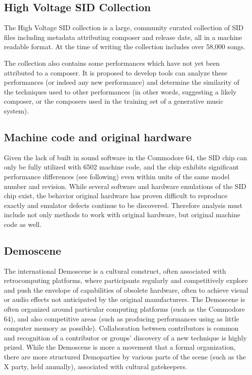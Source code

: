 \documentclass[10pt]{article}
\begin{document}
\begin{multicols*}{2}
  \subsection{High Voltage SID Collection}
  The High Voltage SID collection is a large, community curated
  collection of SID files including metadata attributing composer
  and release date, all in a machine readable format. At the time
  of writing the collection includes over 58,000 songs.

  The collection also contains some performances which have not
  yet been attributed to a composer. It is proposed to develop tools
  can analyze these performances (or indeed any new performance) and
  determine the similarity of the techniques used to other
  performances (in other words, suggesting a likely composer, or the
  composers used in the training set of a generative music system).

  \subsection{Machine code and original hardware}
  Given the lack of built in sound software in the Commodore 64, the
  SID chip can only be fully utilized with 6502 machine code, and the
  chip exhibits significant performance differences (see following)
  even within units of the same model number and revision.  While
  several software and hardware emulations of the SID chip exist, the
  behavior original hardware has proven difficult to reproduce exactly
  and emulator defects continue to be discovered.  Therefore analysis
  must include not only methods to work with original hardware, but
  original machine code as well.

  \subsection{Demoscene}
  The international Demoscene is a cultural construct, often associated
  with retrocomputing platforms, where participants regularly and
  competitively explore and push the envelope of capabilities of obsolete
  hardware, often to achieve visual or audio effects not anticipated
  by the original manufacturers. The Demoscene is often organized around
  particular computing platforms (such as the Commodore 64), and also
  competitive areas (such as producing performances using as little
  computer memory as possible). Collaboration between contributors is
  common and recognition of a contributor or groups' discovery of a new
  technique is highly prized. While the Demoscene is more a movement
  that a formal organization, there are more structured Demoparties by
  various parts of the scene (such as the X party, held annually),
  associated with cultural gatekeepers.


\end{multicols*}
\end{document}
